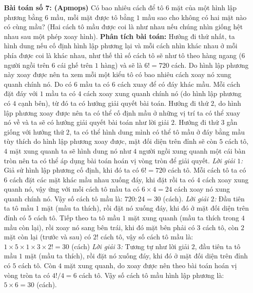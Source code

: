 \vskip 0.1cm
\textbf{\color{toancuabi}Bài toán số $\pmb{7}$: (Apmops)}
\vskip 0.1cm
Có bao nhiêu cách để tô $6$ mặt của một hình lập phương bằng $6$ mầu, mỗi mặt được tô bằng $1$ mầu sao cho không có hai mặt nào có cùng mầu? (Hai cách tô mầu được coi là như nhau nếu chúng nhìn giống hệt nhau sau một phép xoay hình). 
\vskip 0.1cm
\textbf{\color{toancuabi}Phân tích bài toán:} Hướng đi thứ nhất, ta hình dung nếu cố định hình lập phương lại và mỗi cách nhìn khác nhau ở mỗi phía được coi là khác nhau, như thế thì số cách tô sẽ như tô theo hàng ngang ($6$ người ngồi trên $6$ cái ghế trên $1$ hàng) và sẽ là $6!=720$ cách. Do hình lập phương này xoay được nên ta xem mỗi một kiểu tô có bao nhiêu cách xoay nó xung quanh chính nó. Do có $6$ mầu ta có $6$ cách xuay để có đáy khác mầu. Mỗi cách đặt đáy với $1$ mầu ta có $4$ cách xoay xung quanh chính nó (do hình lập phương có $4$ cạnh bên), từ đó ta có hướng giải quyết bài toán.
\vskip 0.1cm
Hướng đi thứ $2$, do hình lập phương xoay được nên ta có thể cố định mầu ở những vị trí ta có thể xuay nó về và ta sẽ có hướng giải quyết bài toán như lời giải $2$.
\vskip 0.1cm
Hướng đi thứ $3$ gần giống với hướng thứ $2$, ta có thể hình dung mình có thể tô mầu ở đáy bằng mầu tùy thích do hình lập phương xoay được, mặt đối diện trên đỉnh sẽ còn $5$ cách tô, $4$ mặt xung quanh ta sẽ hình dung nó như $4$ người ngồi xung quanh một cái bàn tròn nên ta có thể áp dụng bài toán hoán vị vòng tròn để giải quyết.
\vskip 0.1cm
\textit{Lời giải $1$:}
\vskip 0.1cm 
Giả sử hình lập phương cố định, khi đó ta có $6!=720$ cách tô.
\vskip 0.1cm
Mỗi cách tô ta có $6$ cách đặt các mặt khác mầu nhau xuống đáy, khi đặt rồi ta có $4$ cách xoay xung quanh nó, vậy ứng với mỗi cách tô mầu ta có $6\times4=24$ cách xoay nó xung quanh chính nó. Vậy số cách tô mầu là: $720:24=30$ (cách).
\vskip 0.1cm
\textit{Lời giải $2$:}
\vskip 0.1cm 
Đầu tiên ta tô mầu $1$ mặt (mầu ta thích), rồi đặt nó xuống đáy, khi đó ở mặt đối diện trên đỉnh có $5$ cách tô.
\vskip 0.1cm
Tiếp theo ta tô mầu $1$ mặt xung quanh (mầu ta thích trong $4$ mầu còn lại), rồi xoay nó sang bên trái, khi đó mặt bên phải có $3$ cách tô, còn $2$ mặt còn lại (trước và sau) có $2!$ cách tô, vậy số cách tô mầu là: $1\times5\times1\times3\times2!=30$ (cách)
\vskip 0.1cm
\textit{Lời giải $3$:}
\vskip 0.1cm
Tương tự như lời giải $2$, đầu tiên ta tô mầu $1$ mặt (mầu ta thích), rồi đặt nó xuống đáy, khi đó ở mặt đối diện trên đỉnh có $5$ cách tô.
\vskip 0.1cm
Còn $4$ mặt xung quanh, do xoay được nên theo bài toán hoán vị vòng tròn ta có $4!/4=6$ cách tô.
\vskip 0.1cm
Vậy số cách tô mầu hình lập phương là: $5\times 6=30$ (cách).
